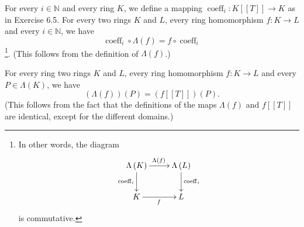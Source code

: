 \documentclass[numbers=enddot,12pt,final,onecolumn,notitlepage]{scrartcl}%
\begin{document}
For every $i\in\mathbb{N}$ and every ring $K$, we define a mapping
$\operatorname*{coeff}\nolimits_{i}:K\left[  \left[  T\right]  \right]
\rightarrow K$ as in Exercise 6.5. For every two rings $K$ and $L$, every ring
homomorphism $f:K\rightarrow L$ and every $i\in\mathbb{N}$, we have%
\begin{equation}
\operatorname*{coeff}\nolimits_{i}\circ\Lambda\left(  f\right)  =f\circ
\operatorname*{coeff}\nolimits_{i} \label{sol.6.11.coeffLambda}%
\end{equation}
\footnote{In other words, the diagram%
\[%
\xymatrix{
\Lambda\left(K\right) \ar[r]^{\Lambda\left(f\right)} \ar[d]_{\operatorname
{coeff}_i} & \Lambda\left(L\right) \ar[d]^{\operatorname{coeff}_i} \\
K \ar[r]_{f} & L
}%
\]
is commutative.}. (This follows from the definition of $\Lambda\left(
f\right)  $.)

For every ring two rings $K$ and $L$, every ring homomorphism $f:K\rightarrow
L$ and every $P\in\Lambda\left(  K\right)  $, we have%
\begin{equation}
\left(  \Lambda\left(  f\right)  \right)  \left(  P\right)  =\left(  f\left[
\left[  T\right]  \right]  \right)  \left(  P\right)  .
\label{sol.6.11.Lambda-restricts}%
\end{equation}
(This follows from the fact that the definitions of the maps $\Lambda\left(
f\right)  $ and $f\left[  \left[  T\right]  \right]  $ are identical, except
for the different domains.)
\end{document}
